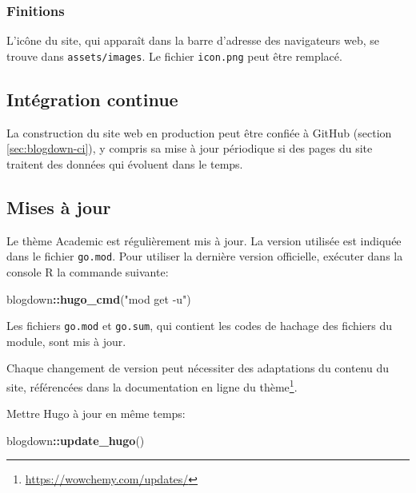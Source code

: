 \documentclass[
  12pt,
  french,
  a4paper,
  extrafontsizes,onecolumn,openright
  ]{memoir}
\newenvironment{Shaded}{\begin{snugshade}}{\end{snugshade}}
\newcommand{\FunctionTok}[1]{\textcolor[rgb]{0.13,0.29,0.53}{\textbf{#1}}}
\newcommand{\NormalTok}[1]{#1}
\newcommand{\SpecialCharTok}[1]{\textcolor[rgb]{0.81,0.36,0.00}{\textbf{#1}}}
\newcommand{\StringTok}[1]{\textcolor[rgb]{0.31,0.60,0.02}{#1}}
\begin{document}
\subsubsection{Finitions}\label{finitions-1}

L'icône du site, qui apparaît dans la barre d'adresse des navigateurs web, se trouve dans \texttt{assets/images}.
Le fichier \texttt{icon.png} peut être remplacé.

\subsection{Intégration continue}\label{sec:rediger-web-ci}

La construction du site web en production peut être confiée à GitHub (section \ref{sec:blogdown-ci}), y compris sa mise à jour périodique si des pages du site traitent des données qui évoluent dans le temps.

\subsection{Mises à jour}\label{mises-uxe0-jour-1}

Le thème Academic est régulièrement mis à jour.
La version utilisée est indiquée dans le fichier \texttt{go.mod}.
Pour utiliser la dernière version officielle, exécuter dans la console R la commande suivante:

\scriptsize

\begin{Shaded}
\begin{Highlighting}[]
\NormalTok{blogdown}\SpecialCharTok{::}\FunctionTok{hugo\_cmd}\NormalTok{(}\StringTok{"mod get {-}u"}\NormalTok{)}
\end{Highlighting}
\end{Shaded}

\normalsize

Les fichiers \texttt{go.mod} et \texttt{go.sum}, qui contient les codes de hachage des fichiers du module, sont mis à jour.

Chaque changement de version peut nécessiter des adaptations du contenu du site, référencées dans la documentation en ligne du thème\footnote{\url{https://wowchemy.com/updates/}}.

Mettre Hugo à jour en même temps:

\scriptsize

\begin{Shaded}
\begin{Highlighting}[]
\NormalTok{blogdown}\SpecialCharTok{::}\FunctionTok{update\_hugo}\NormalTok{()}
\end{Highlighting}
\end{Shaded}
\end{document}
